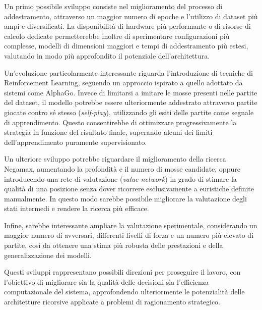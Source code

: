 Un primo possibile sviluppo consiste nel miglioramento del processo di addestramento, attraverso un maggior numero di epoche e l'utilizzo di dataset più ampi e diversificati. La disponibilità di hardware più performante o di risorse di calcolo dedicate permetterebbe inoltre di sperimentare configurazioni più complesse, modelli di dimensioni maggiori e tempi di addestramento più estesi, valutando in modo più approfondito il potenziale dell'architettura.

Un'evoluzione particolarmente interessante riguarda l'introduzione di tecniche di Reinforcement Learning, seguendo un approccio ispirato a quello adottato da sistemi come AlphaGo. Invece di limitarsi a imitare le mosse presenti nelle partite del dataset, il modello potrebbe essere ulteriormente addestrato attraverso partite giocate contro sé stesso (\textit{self-play}), utilizzando gli esiti delle partite come segnale di apprendimento. Questo consentirebbe di ottimizzare progressivamente la strategia in funzione del risultato finale, superando alcuni dei limiti dell'apprendimento puramente supervisionato.

Un ulteriore sviluppo potrebbe riguardare il miglioramento della ricerca Negamax, aumentando la profondità e il numero di mosse candidate, oppure introducendo una rete di valutazione (\textit{value network}) in grado di stimare la qualità di una posizione senza dover ricorrere esclusivamente a euristiche definite manualmente. In questo modo sarebbe possibile migliorare la valutazione degli stati intermedi e rendere la ricerca più efficace.

Infine, sarebbe interessante ampliare la valutazione sperimentale, considerando un maggior numero di avversari, differenti livelli di forza e un numero più elevato di partite, così da ottenere una stima più robusta delle prestazioni e della generalizzazione dei modelli.

Questi sviluppi rappresentano possibili direzioni per proseguire il lavoro, con l'obiettivo di migliorare sia la qualità delle decisioni sia l'efficienza computazionale del sistema, approfondendo ulteriormente le potenzialità delle architetture ricorsive applicate a problemi di ragionamento strategico.

